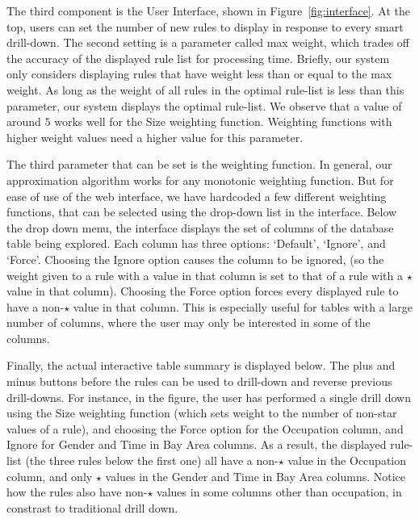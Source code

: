 The third component is the User Interface, shown in Figure~\ref{fig:interface}.
At the top, users can set the number of new rules to display in response to every smart drill-down. The second setting is a parameter called max weight, which trades off the accuracy of the displayed rule list for processing time. Briefly, our system only considers displaying rules that have weight less than or equal to the max weight. As long as the weight of all rules in the optimal rule-list is less than this parameter, our system displays the optimal rule-list. We observe that a value of around $5$ works well for the Size weighting function. Weighting functions with higher weight values need a higher value for this parameter. 

The third parameter that can be set is the weighting function. In general, our approximation algorithm works for any monotonic weighting function. But for ease of use of the web interface, we have hardcoded a few different weighting functions, that can be selected using the drop-down list in the interface. Below the drop down menu, the interface displays the set of columns of the database table being explored. Each column has three options: `Default', `Ignore', and `Force'. Choosing the Ignore option causes the column to be ignored, (so the weight given to a rule with a value in that column is set to that of a rule with a $\star$ value in that column). Choosing the Force option forces every displayed rule to have a non-$\star$ value in that column. This is especially useful for tables with a large number of columns, where the user may only be interested in some of the columns. 

Finally, the actual interactive table summary is displayed below. The plus and minus buttons before the rules can be used to drill-down and reverse previous drill-downs. For instance, in the figure, the user has performed a single drill down using the Size weighting function (which sets weight to the number of non-star values of a rule), and choosing the Force option for the Occupation column, and Ignore for Gender and Time in Bay Area columns. As a result, the displayed rule-list (the three rules below the first one) all have a non-$\star$ value in the Occupation column, and only $\star$ values in the Gender and Time in Bay Area columns. Notice how the rules also have non-$\star$ values in some columns other than occupation, in constrast to traditional drill down.